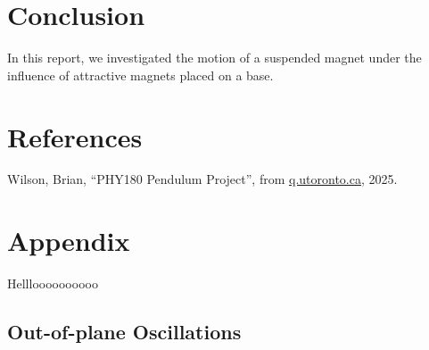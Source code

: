 \documentclass[prl,twocolumn,amsmath,amssymb,superscriptaddress]{revtex4-2}
\begin{document}
\section{Conclusion}
In this report, we investigated the motion of a suspended magnet under the influence of attractive magnets placed on a base.


\onecolumngrid
\newpage

\section{References}

Wilson, Brian, “PHY180 Pendulum Project”, from
\href{https://q.utoronto.ca/courses/411727/files/39071655?module_item_id=7122439}{q.utoronto.ca}, 2025.

\section{Appendix}
Hellloooooooooo

\subsection{Out-of-plane Oscillations}
{}

\end{document}
